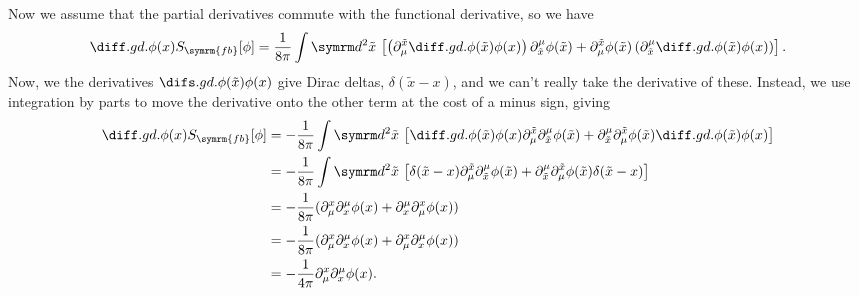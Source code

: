 \documentclass[fleqn]{NotesClass}
\renewcommand{\dl}[1]{\symrm{d}#1}
\newcommand{\freeboson}{\symrm{fb}}
\begin{document}
    Now we assume that the partial derivatives commute with the functional derivative, so we have
    \begin{equation}
        \diffd{}{\phi(x)} S_{\freeboson}[\phi] = \frac{1}{8\pi} \int \dl^2\tilde{x} \, \left[ \left( \partial_\mu^{\tilde{x}} \diffd{\phi(\tilde{x})}{\phi(x)} \right) \partial^\mu_{\tilde{x}}\phi(\tilde{x}) + \partial_\mu^{\tilde{x}}\phi(\tilde{x}) \left(\partial^\mu_{\tilde{x}} \diffd{\phi(\tilde{x})}{\phi(x)} \right) \right].
    \end{equation}
    Now, we the derivatives \(\difsd{\phi(\tilde{x})}{\phi(x)}\) give Dirac deltas, \(\delta(\tilde{x} - x)\), and we can't really take the derivative of these.
    Instead, we use integration by parts to move the derivative onto the other term at the cost of a minus sign, giving
    \begin{align}
        \diffd{}{\phi(x)} S_{\freeboson}[\phi] &= -\frac{1}{8\pi} \int \dl^2\tilde{x} \, \left[ \diffd{\phi(\tilde{x})}{\phi(x)} \partial_\mu^{\tilde{x}}\partial^\mu_{\tilde{x}}\phi(\tilde{x}) + \partial^\mu_{\tilde{x}} \partial_\mu^{\tilde{x}} \phi(\tilde{x})  \diffd{\phi(\tilde{x})}{\phi(x)} \right]\\
        &= -\frac{1}{8\pi} \int \dl^2\tilde{x} \, \left[ \delta(\tilde{x} - x) \partial_\mu^{\tilde{x}}\partial^\mu_{\tilde{x}}\phi(\tilde{x}) + \partial^\mu_{\tilde{x}} \partial_\mu^{\tilde{x}} \phi(\tilde{x}) \delta(\tilde{x} - x) \right] \notag\\
        &= -\frac{1}{8\pi} (\partial_\mu^{x}\partial^\mu_{x}\phi(x) + \partial^\mu_{x} \partial_\mu^{x} \phi(x))\\
        &= -\frac{1}{8\pi} (\partial_\mu^{x}\partial^\mu_{x}\phi(x) + \partial_\mu^{x} \partial^\mu_{x} \phi(x))\\
        &= -\frac{1}{4\pi} \partial_\mu^x\partial^\mu_x\phi(x).
    \end{align}
    
\end{document}
